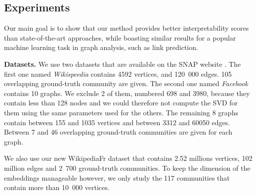 \subsection{Experiments}\label{sec:parfaite_exp}

Our main goal is to show that our method provides better interpretability scores than state-of-the-art approaches, while boasting similar results for a popular machine learning task in graph analysis, such as link prediction. 

\noindent\textbf{Datasets.}
We use two datasets that are available on the SNAP website \cite{SNAP_paper}. The first one named \textit{Wikispeedia} contains 4592 vertices, and 120~000 edges. 105 overlapping ground-truth community are given. The second one named \textit{Facebook} contains 10 graphs. We exclude 2 of them, numbered 698 and 3980, because they contain less than 128 nodes and we could therefore not compute the SVD for them using the same parameters used for the others. The remaining 8 graphs contain between 155 and 1035 vertices and between 3312 and 60050 edges. Between 7 and 46 overlapping ground-truth communities are given for each graph.

We also use our new WikipediaFr dataset that contains 2.52 millions vertices, 102 million edges and 2~700 ground-truth communities. To keep the dimension of the embeddings manageable however, we only study the 117 communities that contain more than 10~000 vertices.


